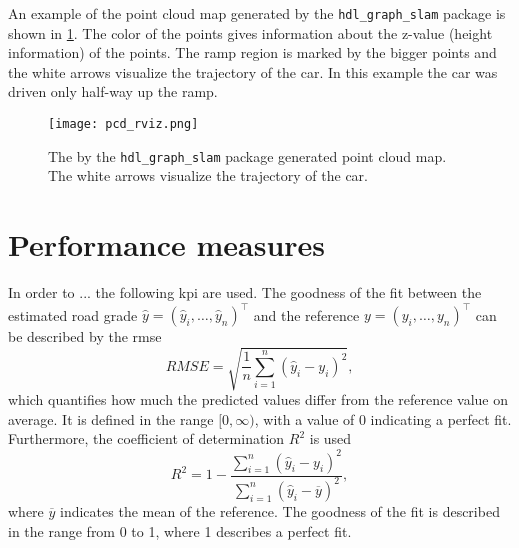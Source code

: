 An example of the point cloud map generated by the \texttt{hdl\_graph\_slam} package is shown in \cref{fig:pcd_rviz}.
The color of the points gives information about the z-value (height information) of the points.
The ramp region is marked by the bigger points and the white arrows visualize the trajectory of the car.
In this example the car was driven only half-way up the ramp.
\begin{figure}[htbp]
	\centering
	\texttt{[image: pcd\_rviz.png]}
	\caption[Generated point cloud]{The by the \texttt{hdl\_graph\_slam} package generated point cloud map. The white arrows visualize the trajectory of the car.}
	\label{fig:pcd_rviz}
\end{figure}



\section{Performance measures}
In order to ...
the following \gls{kpi} are used.
The goodness of the fit between the estimated road grade $\hat{y} = (\hat{y}_i, \dots, \hat{y}_n)^\intercal$ and the reference $y = (y_i, \dots, y_n)^\intercal$ can be described by the \gls{rmse}
\begin{equation}
	RMSE = \sqrt{\frac{1}{n}\sum_{i = 1}^n(\hat{y}_i - y_i)^2},
\end{equation}
which quantifies how much the predicted values differ from the reference value on average.
It is defined in the range $[0, \infty)$, with a value of 0 indicating a perfect fit.
Furthermore, the coefficient of determination $R^2$ is used
\begin{equation}
	R^2 = 1 - \frac{\sum\limits_{i = 1}^n(\hat{y}_i - y_i)^2}{\sum\limits_{i = 1}^n(\hat{y}_i - \overline{y})^2},
\end{equation}
where $\overline{y}$ indicates the mean of the reference.
The goodness of the fit is described in the range from 0 to 1, where 1 describes a perfect fit.\\



